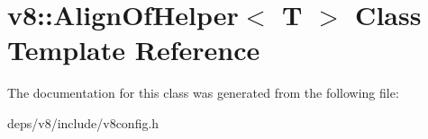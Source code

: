 \hypertarget{classv8_1_1_align_of_helper}{}\section{v8\+:\+:Align\+Of\+Helper$<$ T $>$ Class Template Reference}
\label{classv8_1_1_align_of_helper}


The documentation for this class was generated from the following file\+:\begin{DoxyCompactItemize}
\item 
deps/v8/include/v8config.\+h\end{DoxyCompactItemize}

